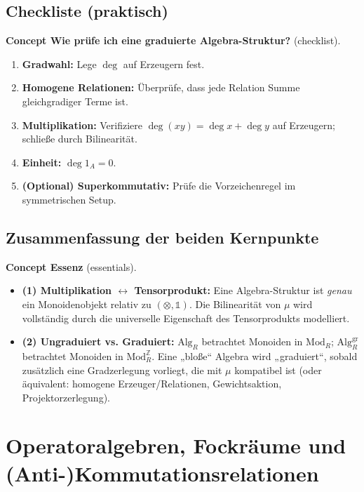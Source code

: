 \documentclass[10pt, letterpaper]{article}
\newcommand{\Mod}{\mathrm{Mod}}
\newcommand{\Alg}{\mathrm{Alg}}
\newcommand{\CustomHeading}[3]{%
  \par\medskip\noindent%
  \textbf{#1 #2} \textnormal{(#3)}.\enskip%
}
\newenvironment{CONC}[2]{\begin{unitbox}\CustomHeading{Concept}{#1}{#2}}{\end{unitbox}}
\begin{document}
\subsection{Checkliste (praktisch)}

\begin{CONC}{Wie prüfe ich eine graduierte Algebra-Struktur?}{checklist}
\begin{enumerate}[leftmargin=*]
  \item \textbf{Gradwahl:} Lege \(\deg\) auf Erzeugern fest.
  \item \textbf{Homogene Relationen:} Überprüfe, dass jede Relation Summe gleichgradiger Terme ist.
  \item \textbf{Multiplikation:} Verifiziere \(\deg(xy)=\deg x+\deg y\) auf Erzeugern; schließe durch Bilinearität.
  \item \textbf{Einheit:} \(\deg 1_A=0\).
  \item \textbf{(Optional) Superkommutativ:} Prüfe die Vorzeichenregel im symmetrischen Setup.
\end{enumerate}
\end{CONC}

\subsection{Zusammenfassung der beiden Kernpunkte}

\begin{CONC}{Essenz}{essentials}
\begin{itemize}[leftmargin=*]
  \item \textbf{(1) Multiplikation \(\leftrightarrow\) Tensorprodukt:} Eine Algebra-Struktur ist \emph{genau} ein Monoidenobjekt relativ zu \((\otimes,\mathbb{1})\). Die Bilinearität von \(\mu\) wird vollständig durch die universelle Eigenschaft des Tensorprodukts modelliert.
  \item \textbf{(2) Ungraduiert vs. Graduiert:} \(\Alg_R\) betrachtet Monoiden in \(\Mod_R\); \(\Alg_R^{\mathrm{gr}}\) betrachtet Monoiden in \(\Mod_R^{\mathbb{Z}}\). Eine „bloße“ Algebra wird „graduiert“, sobald zusätzlich eine Gradzerlegung vorliegt, die mit \(\mu\) kompatibel ist (oder äquivalent: homogene Erzeuger/Relationen, Gewichtsaktion, Projektorzerlegung).
\end{itemize}
\end{CONC}



\pagebreak

\section{Operatoralgebren, Fockräume und (Anti-)Kommutationsrelationen}
\end{document}
